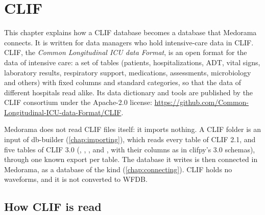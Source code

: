 \chapter{CLIF}
\label{chap:clif}

This chapter explains how a CLIF database becomes a database that Medorama connects. It is
written for data managers who hold intensive-care data in CLIF. CLIF, the \emph{Common
Longitudinal ICU data Format}, is an open format for the data of intensive care: a set of tables
(patients, hospitalizations, ADT, vital signs, laboratory results, respiratory support,
medications, assessments, microbiology and others) with fixed columns and standard categories, so
that the data of different hospitals read alike. Its data dictionary and tools are published by
the CLIF consortium under the Apache-2.0 license:
\url{https://github.com/Common-Longitudinal-ICU-data-Format/CLIF}.

Medorama does not read CLIF files itself: it imports nothing. A CLIF folder is an input of
db-builder (\cref{chap:importing}), which reads every table of CLIF 2.1, and five tables of CLIF
3.0 (, , ,  and
, with their columns as in clifpy's 3.0 schemas), through one known
export per table. The database it writes is then connected in Medorama, as a database of the
kind  (\cref{chap:connecting}). CLIF holds no waveforms, and it is not converted to
WFDB.

\section{How CLIF is read}
\label{sec:clif-reading}

